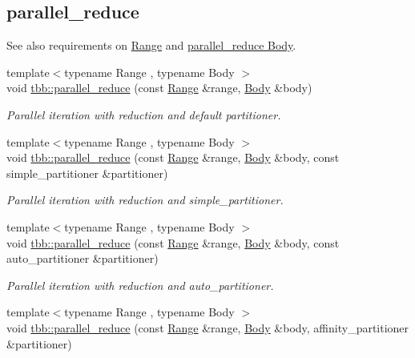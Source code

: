 \subsection*{parallel\+\_\+reduce}
\label{_amgrp949e4773fffd16cb2d32f76af48627d2}%
See also requirements on \hyperlink{range_req}{Range} and \hyperlink{parallel_reduce_body_req}{parallel\+\_\+reduce Body}. \begin{DoxyCompactItemize}
\item 
{\footnotesize template$<$typename Range , typename Body $>$ }\\void \hyperlink{group__algorithms_ga7b1ce9568e0a0efe1bd2d55677bc6687}{tbb\+::parallel\+\_\+reduce} (const \hyperlink{classtbb_1_1blocked__range}{Range} \&range, \hyperlink{classBody}{Body} \&body)
\begin{DoxyCompactList}\small\item\em Parallel iteration with reduction and default partitioner. \end{DoxyCompactList}\item 
{\footnotesize template$<$typename Range , typename Body $>$ }\\void \hyperlink{group__algorithms_gaebb92b593827f9c3f5e1f8ee2f7d5f82}{tbb\+::parallel\+\_\+reduce} (const \hyperlink{classtbb_1_1blocked__range}{Range} \&range, \hyperlink{classBody}{Body} \&body, const simple\+\_\+partitioner \&partitioner)
\begin{DoxyCompactList}\small\item\em Parallel iteration with reduction and simple\+\_\+partitioner. \end{DoxyCompactList}\item 
{\footnotesize template$<$typename Range , typename Body $>$ }\\void \hyperlink{group__algorithms_ga3011e7266fb1e43d307060fe75be2c6e}{tbb\+::parallel\+\_\+reduce} (const \hyperlink{classtbb_1_1blocked__range}{Range} \&range, \hyperlink{classBody}{Body} \&body, const auto\+\_\+partitioner \&partitioner)
\begin{DoxyCompactList}\small\item\em Parallel iteration with reduction and auto\+\_\+partitioner. \end{DoxyCompactList}\item 
{\footnotesize template$<$typename Range , typename Body $>$ }\\void \hyperlink{group__algorithms_ga6e83e121490df24fa5893b14e68f5e2a}{tbb\+::parallel\+\_\+reduce} (const \hyperlink{classtbb_1_1blocked__range}{Range} \&range, \hyperlink{classBody}{Body} \&body, affinity\+\_\+partitioner \&partitioner)

\end{DoxyCompactItemize}
